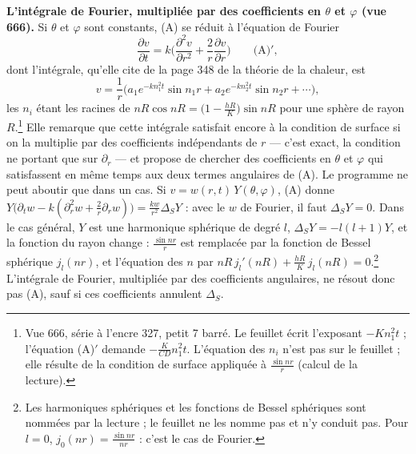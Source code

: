 \documentclass[11pt,a4paper]{article}
\begin{document}
\textbf{L'intégrale de Fourier, multipliée par des coefficients en $\theta$ et
$\varphi$ (vue 666).} Si $\theta$ et $\varphi$ sont constants, (A) se réduit
à l'équation de Fourier
\[
\frac{\partial v}{\partial t} = k\Big(\frac{\partial^2 v}{\partial r^2} +
\frac2r\frac{\partial v}{\partial r}\Big) \qquad \text{(A)}',
\]
dont l'intégrale, qu'elle cite de la page 348 de la théorie de la chaleur, est
\[
v = \frac1r\Big(a_1 e^{-kn_1^2 t}\sin n_1 r + a_2 e^{-kn_2^2 t}\sin n_2 r +
\cdots\Big),
\]
les $n_i$ étant les racines de $nR\cos nR = \big(1 - \frac{hR}{K}\big)\sin nR$
pour une sphère de rayon $R$.\footnote{Vue 666, série à l'encre 327, petit 7
barré. Le feuillet écrit l'exposant $-Kn_1^2t$ ; l'équation (A)$'$ demande
$-\frac{K}{CD}n_1^2t$. L'équation des $n_i$ n'est pas sur le feuillet ; elle
résulte de la condition de surface appliquée à $\frac{\sin nr}{r}$ (calcul de
la lecture).} Elle remarque que cette intégrale satisfait encore à la condition
de surface si on la multiplie par des coefficients indépendants de $r$ — c'est
exact, la condition ne portant que sur $\partial_r$ — et propose de chercher
des coefficients en $\theta$ et $\varphi$ qui satisfassent en même temps aux
deux termes angulaires de (A). Le programme ne peut aboutir que dans un cas.
Si $v = w(r,t)\,Y(\theta,\varphi)$, (A) donne $Y\big(\partial_t w - k(\partial_r^2
w + \frac2r\partial_r w)\big) = \frac{k w}{r^2}\Delta_S Y$ : avec le $w$ de
Fourier, il faut $\Delta_S Y = 0$. Dans le cas général, $Y$ est une harmonique
sphérique de degré $l$, $\Delta_S Y = -l(l+1)Y$, et la fonction du rayon
change : $\frac{\sin nr}{r}$ est remplacée par la fonction de Bessel sphérique
$j_l(nr)$, et l'équation des $n$ par $nR\,j_l'(nR) + \frac{hR}{K}\,j_l(nR) =
0$.\footnote{Les harmoniques sphériques et les fonctions de Bessel sphériques
sont nommées par la lecture ; le feuillet ne les nomme pas et n'y conduit pas.
Pour $l = 0$, $j_0(nr) = \frac{\sin nr}{nr}$ : c'est le cas de Fourier.}
L'intégrale de Fourier, multipliée par des coefficients angulaires, ne résout
donc pas (A), sauf si ces coefficients annulent $\Delta_S$.
\end{document}
